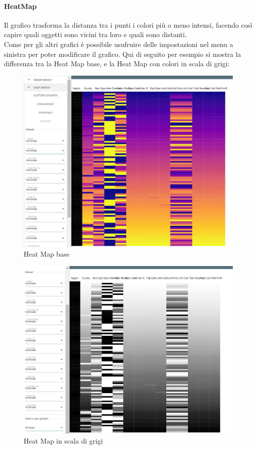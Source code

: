 \documentclass[../manuale_utente.tex]{subfiles}
\begin{document}
\paragraph{HeatMap}
    \label{par:vis_heatmap}

Il grafico  trasforma la distanza tra i punti i colori più o meno intensi, facendo così capire quali oggetti sono vicini tra loro e quali sono distanti. \\
Come per gli altri grafici è possibile usufruire delle impostazioni nel menu a sinistra per poter modificare il grafico. Qui di seguito per esempio si mostra la differenza 
tra la Heat Map base, e la Heat Map con colori in scala di grigi:

\begin{figure}[H]
	\centering
	\includegraphics[width=18cm]{src/img/hm/heat_map_base.jpg}
	\caption{Heat Map base}
\end{figure}

\begin{figure}[H]
	\centering
	\includegraphics[width=18cm]{src/img/hm/heat_map_base_gray.jpg}
	\caption{Heat Map in scala di grigi}
\end{figure}
\end{document}

